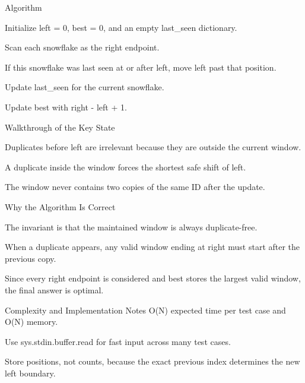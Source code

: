 \documentclass[aspectratio=169,11pt]{beamer}
\begin{document}
\begin{frame}{Algorithm}
\begin{tightitemize}
  \item Initialize left = 0, best = 0, and an empty last\_seen dictionary.
  \item Scan each snowflake as the right endpoint.
  \item If this snowflake was last seen at or after left, move left past that position.
  \item Update last\_seen for the current snowflake.
  \item Update best with right - left + 1.
\end{tightitemize}
\end{frame}

\begin{frame}{Walkthrough of the Key State}
\begin{tightitemize}
  \item Duplicates before left are irrelevant because they are outside the current window.
  \item A duplicate inside the window forces the shortest safe shift of left.
  \item The window never contains two copies of the same ID after the update.
\end{tightitemize}
\end{frame}

\begin{frame}{Why the Algorithm Is Correct}
\begin{tightitemize}
  \item The invariant is that the maintained window is always duplicate-free.
  \item When a duplicate appears, any valid window ending at right must start after the previous copy.
  \item Since every right endpoint is considered and best stores the largest valid window, the final answer is optimal.
\end{tightitemize}
\end{frame}

\begin{frame}{Complexity and Implementation Notes}
\small
{} O(N) expected time per test case and O(N) memory.

\vspace{0.3cm}
\begin{tightitemize}
  \item Use sys.stdin.buffer.read for fast input across many test cases.
  \item Store positions, not counts, because the exact previous index determines the new left boundary.
\end{tightitemize}
\end{frame}
\end{document}
